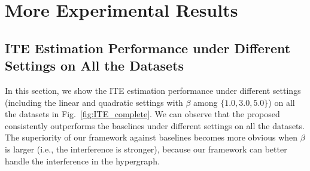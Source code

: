 \section{More Experimental Results}
\subsection{ITE Estimation Performance under Different Settings on All the Datasets}
In this section, we show the ITE estimation performance under different settings (including the linear and quadratic settings with $\beta$ among $\{1.0, 3.0, 5.0\}$) on all the datasets in Fig.~\ref{fig:ITE_complete}. We can observe that the proposed \mymodel~ consistently outperforms the baselines under different settings on all the datasets. The superiority of our framework against baselines becomes more obvious when $\beta$ is larger (i.e., the interference is stronger), because our framework can better handle the interference in the hypergraph.







